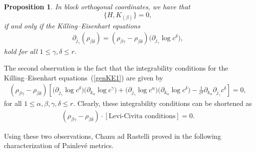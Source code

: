 \documentclass[pdftex]{sigma}
\numberwithin{equation}{section}
\newtheorem{Proposition}[Theorem]{Proposition}
 { \theoremstyle{definition}
\newtheorem{Definition}[Theorem]{Definition}
\newtheorem{Example}[Theorem]{Example}
\newtheorem{Remark}[Theorem]{Remark} }
\newcommand{\kalpha}{k_{\alpha}}
\newcommand{\jgamma}{j_{\gamma}}
\begin{document}
\begin{Proposition}In block orthogonal coordinates, we have that
\[
 \big\{H,K_{(\beta)} \big\} = 0,
\]	
if and only if the Killing--Eisenhart equations
\begin{gather}\label{genKE1}
 \partial_{j_{\gamma}}(\rho_{ \beta \delta})= (\rho_{\beta \gamma} - \rho_{\beta \delta }) \big(\partial_{j_{\gamma}} \log c^\delta\big),
\end{gather}
hold for all $1 \leq \gamma, \delta \leq r$.
\end{Proposition}

The second observation is the fact that the integrability conditions for the Killing--Eisenhart equations~(\ref{genKE1}) are given by
\begin{gather*} %
 (\rho_{\beta \gamma} - \rho_{\beta \delta}) \left[ \big( \partial_{\jgamma} \log c^{\delta} \big) \big( \partial_{\kalpha} \log c^{\gamma}\big) + \big(\partial_{\jgamma} \log c^{\alpha} \big) \big( \partial_{\kalpha} \log c^{\delta} \big) - \frac{1}{c^{\delta}} \partial_{\kalpha}\partial_{\jgamma}c^{\delta} \right] = 0,
\end{gather*}
for all $1 \leq \alpha, \beta, \gamma, \delta \leq r$. Clearly, these integrability conditions can be shortened as
\begin{gather} \label{IC2}
 (\rho_{\beta \gamma} - \rho_{\beta \delta}) \cdot \left[ \textrm{Levi-Civita conditions} \right] = 0.
\end{gather}

Using these two observations, Chanu ad Rastelli proved in \cite[Proposition 5.5]{CR2019} the following characterization of Painlev\'e metrics.
\end{document}

